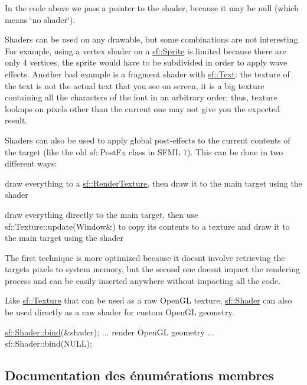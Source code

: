 In the code above we pass a pointer to the shader, because it may be null (which means \char`\"{}no shader\char`\"{}).

Shaders can be used on any drawable, but some combinations are not interesting. For example, using a vertex shader on a \hyperlink{classsf_1_1Sprite}{sf\+::\+Sprite} is limited because there are only 4 vertices, the sprite would have to be subdivided in order to apply wave effects. Another bad example is a fragment shader with \hyperlink{classsf_1_1Text}{sf\+::\+Text}\+: the texture of the text is not the actual text that you see on screen, it is a big texture containing all the characters of the font in an arbitrary order; thus, texture lookups on pixels other than the current one may not give you the expected result.

Shaders can also be used to apply global post-\/effects to the current contents of the target (like the old sf\+::\+Post\+Fx class in S\+F\+ML 1). This can be done in two different ways\+: \begin{DoxyItemize}
\item draw everything to a \hyperlink{classsf_1_1RenderTexture}{sf\+::\+Render\+Texture}, then draw it to the main target using the shader \item draw everything directly to the main target, then use sf\+::\+Texture\+::update(\+Window\&) to copy its contents to a texture and draw it to the main target using the shader\end{DoxyItemize}
The first technique is more optimized because it doesn\textquotesingle{}t involve retrieving the target\textquotesingle{}s pixels to system memory, but the second one doesn\textquotesingle{}t impact the rendering process and can be easily inserted anywhere without impacting all the code.

Like \hyperlink{classsf_1_1Texture}{sf\+::\+Texture} that can be used as a raw Open\+GL texture, \hyperlink{classsf_1_1Shader}{sf\+::\+Shader} can also be used directly as a raw shader for custom Open\+GL geometry. 
\begin{DoxyCode}
\hyperlink{classsf_1_1Shader_a09778f78afcbeb854d608c8dacd8ea30}{sf::Shader::bind}(&shader);
... render OpenGL geometry ...
sf::Shader::bind(NULL);
\end{DoxyCode}
 

\subsection{Documentation des énumérations membres}
\mbox{\label{classsf_1_1Shader_afaa1aa65e5de37b74d047da9def9f9b3}} 
